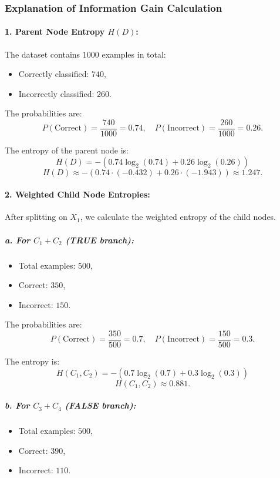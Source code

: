 \documentclass[10pt,a4paper]{article}
\begin{document}
\subsubsection*{Explanation of Information Gain Calculation}

\paragraph{1. Parent Node Entropy \(H(D)\):}
The dataset contains \(1000\) examples in total:
\begin{itemize}
    \item Correctly classified: \(740\),
    \item Incorrectly classified: \(260\).
\end{itemize}

The probabilities are:
\[
P(\text{Correct}) = \frac{740}{1000} = 0.74, \quad P(\text{Incorrect}) = \frac{260}{1000} = 0.26.
\]

The entropy of the parent node is:
\[
H(D) = - \left( 0.74 \log_2(0.74) + 0.26 \log_2(0.26) \right)
\]
\[
H(D) \approx - \left( 0.74 \cdot (-0.432) + 0.26 \cdot (-1.943) \right) \approx 1.247.
\]

\paragraph{2. Weighted Child Node Entropies:}
After splitting on \(X_1\), we calculate the weighted entropy of the child nodes.

\subparagraph{a. For \(C_1 + C_2\) (TRUE branch):}
\begin{itemize}
    \item Total examples: \(500\),
    \item Correct: \(350\),
    \item Incorrect: \(150\).
\end{itemize}

The probabilities are:
\[
P(\text{Correct}) = \frac{350}{500} = 0.7, \quad P(\text{Incorrect}) = \frac{150}{500} = 0.3.
\]

The entropy is:
\[
H(C_1, C_2) = - \left( 0.7 \log_2(0.7) + 0.3 \log_2(0.3) \right)
\]
\[
H(C_1, C_2) \approx 0.881.
\]

\subparagraph{b. For \(C_3 + C_4\) (FALSE branch):}
\begin{itemize}
    \item Total examples: \(500\),
    \item Correct: \(390\),
    \item Incorrect: \(110\).
\end{itemize}
\end{document}
